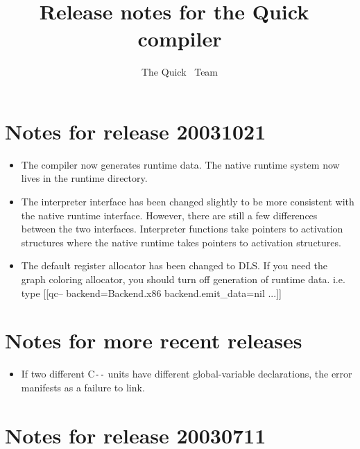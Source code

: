 \documentclass{article}
\title{Release notes for the Quick~{\PAL} compiler}
\author{The Quick~{\PAL} Team}
\def\PAL{\mbox{C{\texttt{-{}-}}}}
\begin{document}
\maketitle

\section{Notes for release 20031021}
\begin{itemize}

\item
The compiler now generates runtime data. The native runtime system now
lives in the runtime directory.

\item
The interpreter interface has been changed slightly to be more
consistent with the native runtime interface. However, there are still
a few differences between the two interfaces. Interpreter functions
take pointers to activation structures where the native runtime takes
pointers to activation structures.

\item
The default register allocator has been changed to DLS. If you need
the graph coloring allocator, you should turn off generation of runtime
data. i.e. type [[qc-- backend=Backend.x86 backend.emit_data=nil ...]]

\end{itemize}

\section{Notes for more recent releases}

\begin{itemize}
\item
If two different {\PAL} units have different global-variable
declarations, the error manifests as a failure to link.
\end{itemize}


\section{Notes for release 20030711}
\end{document}
